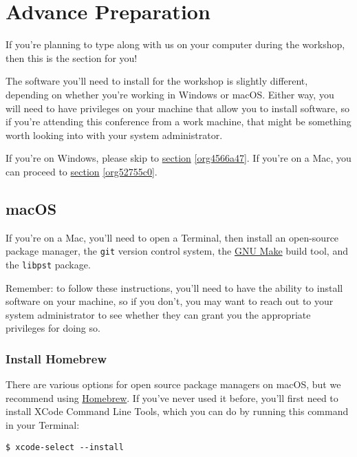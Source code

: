 \documentclass[11pt]{article}
\begin{document}
\section{Advance Preparation \label{org7d354bc}}
\label{sec:orge0a2838}

If you're planning to type along with us on your computer during the
workshop, then this is the section for you!

The software you'll need to install for the workshop is slightly
different, depending on whether you're working in Windows or macOS.
Either way, you will need to have privileges on your machine that
allow you to install software, so if you're attending this conference
from a work machine, that might be something worth looking into with
your system administrator.

If you're on Windows, please skip to \hyperref[org4566a47]{section} \ref{org4566a47}.  If you're on a
Mac, you can proceed to \hyperref[org52755c0]{section} \ref{org52755c0}.

\subsection{macOS \label{org52755c0}}
\label{sec:org3cc6296}

If you're on a Mac, you'll need to open a Terminal, then install an
open-source package manager, the \texttt{git} version control system, the
\href{https://www.gnu.org/software/make/}{GNU Make} build tool, and the
\texttt{libpst} package.

Remember: to follow these instructions, you'll need to have the
ability to install software on your machine, so if you don't, you may
want to reach out to your system administrator to see whether they can
grant you the appropriate privileges for doing so.

\subsubsection{Install Homebrew}
\label{sec:orga748e9f}

There are various options for open source package managers on macOS,
but we recommend using \href{https://brew.sh}{Homebrew}.  If you've never used it
before, you'll first need to install XCode Command Line Tools, which
you can do by running this command in your Terminal:

\begin{verbatim}
$ xcode-select --install
\end{verbatim}
\end{document}
